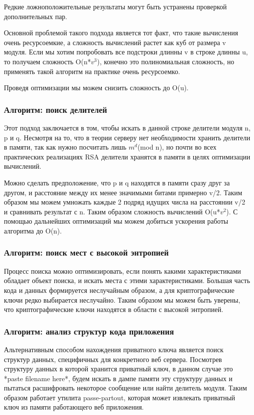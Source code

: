 \documentclass[20pt]{article}
\begin{document}
Редкие ложноположительные результаты могут быть устранены проверкой
дополнительных пар.

Основной проблемой такого подхода является тот факт, что такие вычисления очень
ресурсоемкие, а сложность вычислений растет как куб от размера v модуля. Если мы
хотим попробовать все подстроки длинны v в строке длинны u, то получаем сложность
O(n*$v^3$), конечно это полиномиальная сложность, но применять такой алгоритм
на практике очень ресурсоемко.

Проведя оптимизации мы можем снизить сложность до O(u).

\subsubsection{Алгоритм: поиск делителей}
Этот подход заключается в том, чтобы искать в данной строке делители модуля n,
p и q. Несмотря на то, что в теории серверу нет необходимости хранить делители в
памяти, так как нужно посчитать лишь $m^d$(mod n), но почти во всех практических
реализациях RSA делители хранятся в памяти в целях оптимизации вычислений.

Можно сделать предположение, что p и q находятся в памяти сразу друг за другом,
и расстояние между их менее значимыми битами примерно v/2. Таким образом мы можем
умножать каждые 2 подряд идущих числа на расстоянии v/2 и сравнивать результат с
n. Таким образом сложность вычислений O(u*$v^2$). С помощью дальнейших оптимизаций
мы можем добиться ускорения работы алгоритма до O(n).

\subsubsection{Алгоритм: поиск мест с высокой энтропией}
Процесс поиска можно оптимизировать, если понять какими характеристиками обладает
объект поиска, и искать места с этими характеристиками. Большая часть кода и данных
формируется неслучайным образом, а для криптографические ключи редко выбирается
неслучайно. Таким образом мы можем быть уверены, что криптографические ключи находятся
в области с высокой энтропией.

\subsubsection{Алгоритм: анализ структур кода приложения}
Альтернативным способом нахождения приватного ключа является поиск структур
данных, специфичных для конкретного веб сервера. Посмотрев структуру данных в которой
хранится приватный ключ, в данном случае это *paste filename here*, будем искать
в дампе памяти эту структуру данных и пытаться расшифровать некоторое сообщение
или найти делитель модуля. Таким образом работает утилита passe-partout, которая
может извлекать приватный ключ из памяти работающего веб приложения.
\end{document}
